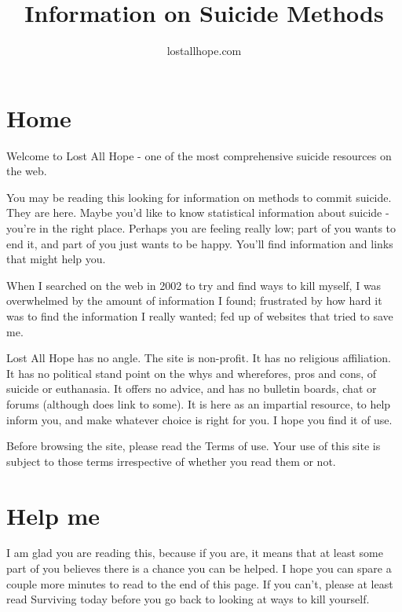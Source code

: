 \documentclass[12pt]{article}
\title{Information on Suicide Methods}
\author{lostallhope.com}
\date{}                                           %
\begin{document}
\maketitle

\newpage

\tableofcontents

\newpage

\section{Home}

Welcome to Lost All Hope - one of the most comprehensive suicide resources on the web.

You may be reading this looking for information on methods to commit suicide. They are here. Maybe you'd like to know statistical information about suicide - you're in the right place. Perhaps you are feeling really low; part of you wants to end it, and part of you just wants to be happy. You'll find information and links that might help you.

When I searched on the web in 2002 to try and find ways to kill myself, I was overwhelmed by the amount of information I found; frustrated by how hard it was to find the information I really wanted; fed up of websites that tried to save me.

Lost All Hope has no angle. The site is non-profit. It has no religious affiliation. It has no political stand point on the whys and wherefores, pros and cons, of suicide or euthanasia. It offers no advice, and has no bulletin boards, chat or forums (although does link to some). It is here as an impartial resource, to help inform you, and make whatever choice is right for you. I hope you find it of use.

Before browsing the site, please read the Terms of use. Your use of this site is subject to those terms irrespective of whether you read them or not.

\section{Help me}

I am glad you are reading this, because if you are, it means that at least some part of you believes there is a chance you can be helped. I hope you can spare a couple more minutes to read to the end of this page. If you can't, please at least read Surviving today before you go back to looking at ways to kill yourself.
\end{document}
